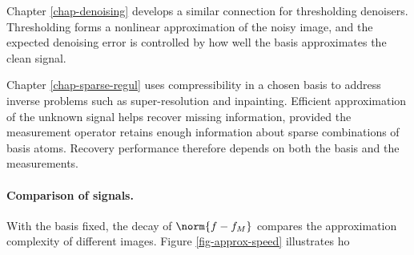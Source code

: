 Chapter \ref{chap-denoising} develops a similar connection for thresholding denoisers. Thresholding forms a nonlinear approximation of the noisy image, and the expected denoising error is controlled by how well the basis approximates the clean signal.

Chapter \ref{chap-sparse-regul} uses compressibility in a chosen basis to address inverse problems such as super-resolution and inpainting. Efficient approximation of the unknown signal helps recover missing information, provided the measurement operator retains enough information about sparse combinations of basis atoms. Recovery performance therefore depends on both the basis and the measurements.



    
\paragraph{Comparison of signals.}

With the basis fixed, the decay of $\norm{f-f_M}$ compares the approximation complexity of different images. Figure \ref{fig-approx-speed} illustrates ho